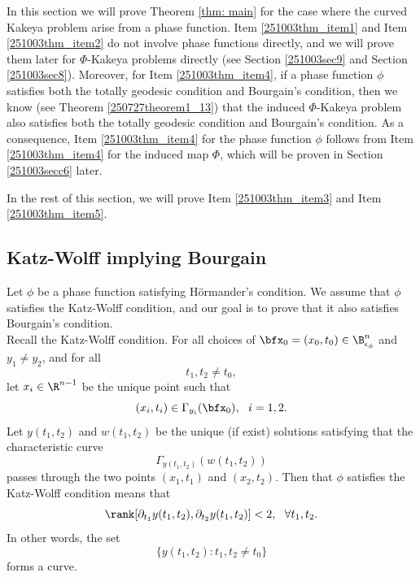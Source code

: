 \documentclass{article}
\numberwithin{equation}{section}
\theoremstyle{plain}
\begin{document}
In this section we will prove Theorem \ref{thm: main} for the case where the curved Kakeya problem arise from a phase function. Item \ref{251003thm_item1} and Item \ref{251003thm_item2} do not involve phase functions directly, and we will prove them later for $\Phi$-Kakeya problems directly (see Section \ref{251003sec9} and Section \ref{251003sec8}). Moreover, for Item \ref{251003thm_item4}, if a phase function $\phi$ satisfies both the totally geodesic condition and Bourgain's condition, then we know (see Theorem \ref{250727theorem1_13}) that the induced $\Phi$-Kakeya problem also satisfies both the totally geodesic condition and Bourgain's condition. As a consequence, Item \ref{251003thm_item4} for the phase function $\phi$ follows from Item \ref{251003thm_item4} for the induced map $\Phi$, which will be proven in Section \ref{251003secc6} later. 

  In the rest of this section, we will prove Item \ref{251003thm_item3} and  Item \ref{251003thm_item5}. 





\subsection{Katz-Wolff implying Bourgain}\label{25-Sec4.1}



Let $\phi$ be a phase function satisfying H\"ormander's condition. We assume that $\phi$ satisfies the Katz-Wolff condition, and our goal is to prove that it also satisfies Bourgain's condition. \\


Recall the Katz-Wolff condition. For all choices of $\bfx_0=(x_0, t_0)\in \B^{n}_{\epsilon_{\phi}}$ and $y_1\neq y_2$, and for all 
\begin{equation}
t_1, t_2\neq t_0,
\end{equation}
let $x_i\in \R^{n-1}$ be the unique point such that 
\begin{equation}
(x_i, t_i)\in \Gamma_{y_i}(\bfx_0), \ \ i=1, 2.
\end{equation}
Let $y(t_1, t_2)$ and $w(t_1, t_2)$ be the unique (if exist) solutions satisfying that the characteristic curve 
\begin{equation}
\Gamma_{y(t_1, t_2)}(w(t_1, t_2))
\end{equation}
passes through the two points $(x_1, t_1)$ and $(x_2, t_2)$. Then that $\phi$ satisfies the Katz-Wolff condition means that   
 \begin{equation}
        \rank[\partial_{t_1} y(t_1, t_2), \partial_{t_2} y(t_1, t_2)]<2, \ \ \forall t_1, t_2.
    \end{equation} 
In other words, the set 
\begin{equation}\label{250510e2_5}
\{
y(t_1, t_2): t_1, t_2\neq t_0
\}
\end{equation}
forms a curve. \\
\end{document}
